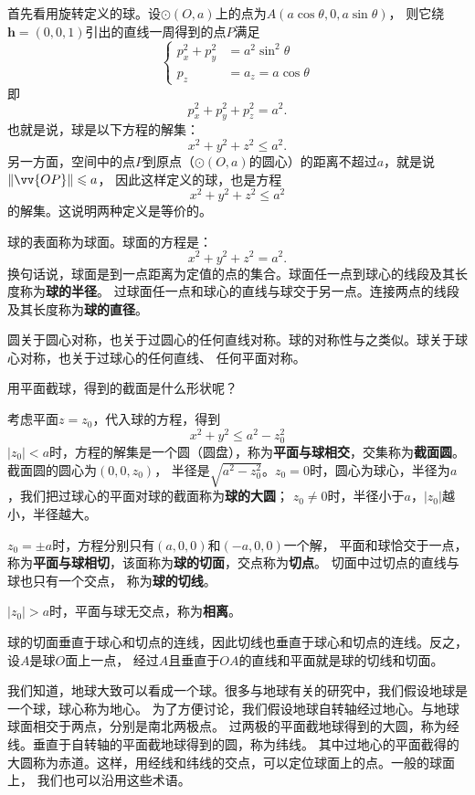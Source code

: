 \documentclass[12pt,UTF8]{ctexbook}
\begin{document}
首先看用旋转定义的球。设$\odot(O,a)$上的点为$A(a\cos{\theta}, 0, a\sin{\theta})$，
则它绕$\mathbf{h} = (0,0,1)$引出的直线一周得到的点$P$满足
$$
\left\{
\begin{array}{rl}
p_x^2+p_y^2 &= a^2\sin^2{\theta} \\
p_z &= a_z = a\cos{\theta}
\end{array}
\right.
$$
即
$$ p_x^2 + p_y^2 + p_z^2 = a^2.$$
也就是说，球是以下方程的解集：
$$ x^2 + y^2 + z^2 \leqslant a^2.$$
另一方面，空间中的点$P$到原点（$\odot(O,a)$的圆心）的距离不超过$a$，就是说$\|\vv{OP}\| \leqslant a$​，
因此这样定义的球，也是方程
$$ x^2 + y^2 + z^2 \leqslant a^2$$
的解集。这说明两种定义是等价的。

球的表面称为球面。球面的方程是：
$$ x^2 + y^2 + z^2 = a^2.$$
换句话说，球面是到一点距离为定值的点的集合。球面任一点到球心的线段及其长度称为\textbf{球的半径}。
过球面任一点和球心的直线与球交于另一点。连接两点的线段及其长度称为\textbf{球的直径}。

圆关于圆心对称，也关于过圆心的任何直线对称。球的对称性与之类似。球关于球心对称，也关于过球心的任何直线、
任何平面对称。

用平面截球，得到的截面是什么形状呢？

考虑平面$z=z_0$，代入球的方程，得到
$$ x^2 + y^2 \leqslant a^2-z_0^2 $$
$|z_0|<a$时，方程的解集是一个圆（圆盘），称为\textbf{平面与球相交}，交集称为\textbf{截面圆}。截面圆的圆心为$(0,0,z_0)$，
半径是$\sqrt{a^2-z_0^2}$。$z_0=0$时，圆心为球心，半径为$a$，我们把过球心的平面对球的截面称为\textbf{球的大圆}；
$z_0\neq 0$时，半径小于$a$，$|z_0|$越小，半径越大。

$z_0=\pm a$时，方程分别只有$(a,0,0)$和$(-a,0,0)$一个解，
平面和球恰交于一点，称为\textbf{平面与球相切}，该面称为\textbf{球的切面}，交点称为\textbf{切点}。
切面中过切点的直线与球也只有一个交点，
称为\textbf{球的切线}。

$|z_0|>a$时，平面与球无交点，称为\textbf{相离}。

球的切面垂直于球心和切点的连线，因此切线也垂直于球心和切点的连线。反之，设$A$是球$O$面上一点，
经过$A$且垂直于$OA$的直线和平面就是球的切线和切面。

我们知道，地球大致可以看成一个球。很多与地球有关的研究中，我们假设地球是一个球，球心称为地心。
为了方便讨论，我们假设地球自转轴经过地心。与地球球面相交于两点，分别是南北两极点。
过两极的平面截地球得到的大圆，称为经线。垂直于自转轴的平面截地球得到的圆，称为纬线。
其中过地心的平面截得的大圆称为赤道。这样，用经线和纬线的交点，可以定位球面上的点。一般的球面上，
我们也可以沿用这些术语。
\end{document}

